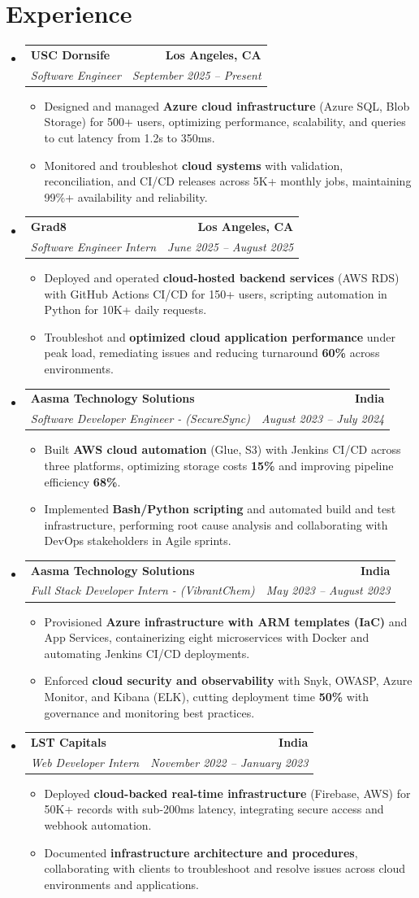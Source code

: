 \documentclass[letterpaper,10pt]{article}
\makeatletter
\newcommand{\resumeItem}[1]{\item\small{{#1 \vspace{-2pt}}}}
\newcommand{\resumeSubheading}[4]{\vspace{-1pt}\item\begin{tabular*}{1.0\textwidth}[t]{l@{\extracolsep{\fill}}r}\textbf{#1} & \textbf{\small #2} \\\textit{\small#3} & \textit{\small #4} \\\end{tabular*}\vspace{-2pt}}
\newcommand{\resumeSubHeadingListStart}{\begin{itemize}[leftmargin=0.0in, label={}]}
\newcommand{\resumeSubHeadingListEnd}{\end{itemize}}
\newcommand{\resumeItemListStart}{\begin{itemize}[leftmargin=0.15in,label=\textbullet,itemsep=2pt,topsep=0pt,parsep=0pt,partopsep=0pt]}
\newcommand{\resumeItemListEnd}{\end{itemize}\vspace{-4pt}}
\makeatother
\begin{document}
\section{Experience}
\resumeSubHeadingListStart
\resumeSubheading{USC Dornsife}{Los Angeles, CA}{Software Engineer}{September 2025 -- Present}
\resumeItemListStart
\resumeItem{Designed and managed \textbf{Azure cloud infrastructure} (Azure SQL, Blob Storage) for 500+ users, optimizing performance, scalability, and queries to cut latency from 1.2s to 350ms.}
\resumeItem{Monitored and troubleshot \textbf{cloud systems} with validation, reconciliation, and CI/CD releases across 5K+ monthly jobs, maintaining 99\%+ availability and reliability.}
\resumeItemListEnd
\resumeSubheading{Grad8}{Los Angeles, CA}{Software Engineer Intern}{June 2025 -- August 2025}
\resumeItemListStart
\resumeItem{Deployed and operated \textbf{cloud-hosted backend services} (AWS RDS) with GitHub Actions CI/CD for 150+ users, scripting automation in Python for 10K+ daily requests.}
\resumeItem{Troubleshot and \textbf{optimized cloud application performance} under peak load, remediating issues and reducing turnaround \textbf{60\%} across environments.}
\resumeItemListEnd
\resumeSubheading{Aasma Technology Solutions}{India}{Software Developer Engineer - (SecureSync)}{August 2023 -- July 2024}
\resumeItemListStart
\resumeItem{Built \textbf{AWS cloud automation} (Glue, S3) with Jenkins CI/CD across three platforms, optimizing storage costs \textbf{15\%} and improving pipeline efficiency \textbf{68\%}.}
\resumeItem{Implemented \textbf{Bash/Python scripting} and automated build and test infrastructure, performing root cause analysis and collaborating with DevOps stakeholders in Agile sprints.}
\resumeItemListEnd
\resumeSubheading{Aasma Technology Solutions}{India}{Full Stack Developer Intern - (VibrantChem)}{May 2023 -- August 2023}
\resumeItemListStart
\resumeItem{Provisioned \textbf{Azure infrastructure with ARM templates (IaC)} and App Services, containerizing eight microservices with Docker and automating Jenkins CI/CD deployments.}
\resumeItem{Enforced \textbf{cloud security and observability} with Snyk, OWASP, Azure Monitor, and Kibana (ELK), cutting deployment time \textbf{50\%} with governance and monitoring best practices.}
\resumeItemListEnd
\resumeSubheading{LST Capitals}{India}{Web Developer Intern}{November 2022 -- January 2023}
\resumeItemListStart
\resumeItem{Deployed \textbf{cloud-backed real-time infrastructure} (Firebase, AWS) for 50K+ records with sub-200ms latency, integrating secure access and webhook automation.}
\resumeItem{Documented \textbf{infrastructure architecture and procedures}, collaborating with clients to troubleshoot and resolve issues across cloud environments and applications.}
\resumeItemListEnd
\resumeSubHeadingListEnd
\vspace{-6pt}
\end{document}
